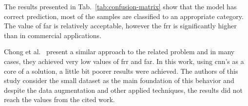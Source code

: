 The results presented in \mbox{Tab.~\ref{tab:confusion-matrix}} show that the model has correct prediction, most of the samples are classified to an appropriate category.
The value of \gls{far} is relatively acceptable, however the \gls{frr} is significantly higher than in commercial applications.

Chong et al.~\cite{Main} present a similar approach to the related problem and in many cases, they achieved very low values of \gls{frr} and \gls{far}.
In this work, using \gls{cnn}'s as a core of a solution, a little bit poorer results were achieved.
The authors of this study consider the small dataset as the main foundation of this behavior and despite the data augmentation and other applied techniques, the results did not reach the values from the cited work.
